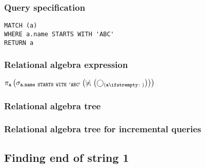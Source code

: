 \subsubsection*{Query specification}

\begin{lstlisting}
MATCH (a)
WHERE a.name STARTS WITH 'ABC'
RETURN a
\end{lstlisting}

\subsubsection*{Relational algebra expression}

$\projection{\var{a}} \left(\selection{\mathtt{a.name~STARTS~WITH~'ABC'}} \left(\alldifferent{} \left(\getvertices{a}{}\right)\right)\right)$

\subsubsection*{Relational algebra tree}


\subsubsection*{Relational algebra tree for incremental queries}


\subsection{Finding end of string 1}

